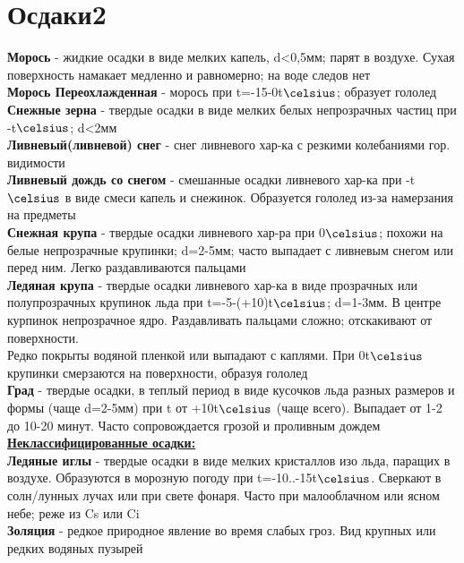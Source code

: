 
\section{Осдаки2}
\textbf{Морось} - жидкие осадки в виде мелких капель, d<0,5мм; парят в воздухе. Сухая поверхность намакает медленно и равномерно; на воде следов нет\\
\textbf{Морось Переохлажденная} - морось при t=-15-0t$\celsius$; образует гололед\\

\textbf{Снежные зерна} - твердые осадки в виде мелких белых непрозрачных частиц при -t$\celsius$; d<2мм\\

\textbf{Ливневый(ливневой) снег} - снег ливневого хар-ка с резкими колебаниями гор. видимости\\
\textbf{Ливневый дождь со снегом} - смешанные осадки ливневого хар-ка при -t$\celsius$ в виде смеси капель и снежинок. Образуется гололед из-за намерзания на предметы\\

\textbf{Снежная крупа} - твердые осадки ливневого хар-ра при 0$\celsius$; похожи на белые непрозрачные крупинки; d=2-5мм; часто выпадает с ливневым снегом или перед ним. Легко раздавливаются пальцами\\
\textbf{Ледяная крупа} - твердые осадки ливневого хар-ка в виде прозрачных или полупрозрачных крупинок льда при t=-5-(+10)t$\celsius$; d=1-3мм. В центре курпинок непрозрачное ядро. Раздавливать пальцами сложно; отскакивают от поверхности.\\
Редко покрыты водяной пленкой  или выпадают с каплями. При 0t$\celsius$ крупинки смерзаются на поверхности, образуя гололед\\

\textbf{Град} - твердые осадки, в теплый период в виде кусочков льда разных размеров и формы (чаще d=2-5мм) при t от +10t$\celsius$ (чаще всего). Выпадает от 1-2 до 10-20 минут. Часто сопровождается грозой и проливным дождем\\

\underline{\textbf{Неклассифицированные осадки:}}\\
\textbf{Ледяные иглы} - твердые осадки в виде мелких кристаллов изо льда, паращих в воздухе. Образуются в морозную погоду при t=-10..-15t$\celsius$. Сверкают в солн/лунных лучах или при свете фонаря. Часто при малооблачном или ясном небе; реже из Cs или Ci\\
\textbf{Золяция} - редкое природное явление во время слабых гроз. Вид крупных или редких водяных пузырей\\


